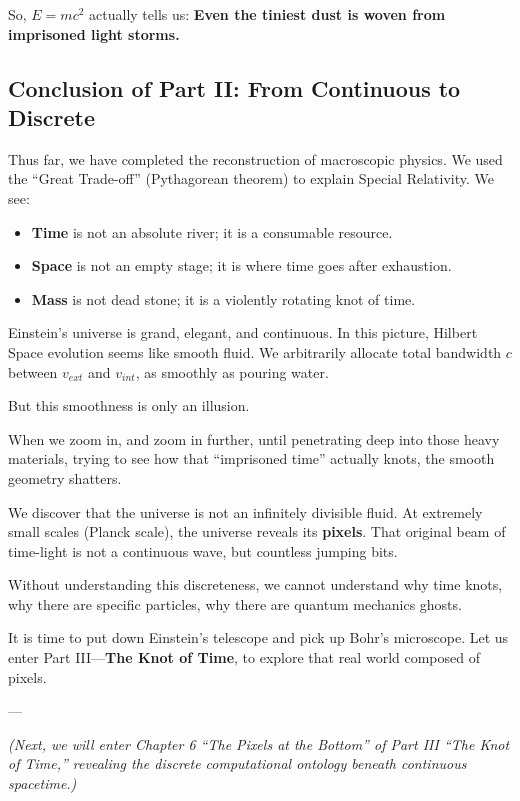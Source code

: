 \documentclass[11pt,a4paper,twoside]{book}
\begin{document}
So, $E=mc^2$ actually tells us: \textbf{Even the tiniest dust is woven from imprisoned light storms.}

\subsection{Conclusion of Part II: From Continuous to Discrete}

Thus far, we have completed the reconstruction of macroscopic physics. We used the ``Great Trade-off'' (Pythagorean theorem) to explain Special Relativity. We see:

\begin{itemize}
\item \textbf{Time} is not an absolute river; it is a consumable resource.

\item \textbf{Space} is not an empty stage; it is where time goes after exhaustion.

\item \textbf{Mass} is not dead stone; it is a violently rotating knot of time.
\end{itemize}

Einstein's universe is grand, elegant, and continuous. In this picture, Hilbert Space evolution seems like smooth fluid. We arbitrarily allocate total bandwidth $c$ between $v_{ext}$ and $v_{int}$, as smoothly as pouring water.

But this smoothness is only an illusion.

When we zoom in, and zoom in further, until penetrating deep into those heavy materials, trying to see how that ``imprisoned time'' actually knots, the smooth geometry shatters.

We discover that the universe is not an infinitely divisible fluid. At extremely small scales (Planck scale), the universe reveals its \textbf{pixels}. That original beam of time-light is not a continuous wave, but countless jumping bits.

Without understanding this discreteness, we cannot understand why time knots, why there are specific particles, why there are quantum mechanics ghosts.

It is time to put down Einstein's telescope and pick up Bohr's microscope. Let us enter Part III---\textbf{The Knot of Time}, to explore that real world composed of pixels.

---

\textit{(Next, we will enter Chapter 6 ``The Pixels at the Bottom'' of Part III ``The Knot of Time,'' revealing the discrete computational ontology beneath continuous spacetime.)}
\end{document}
